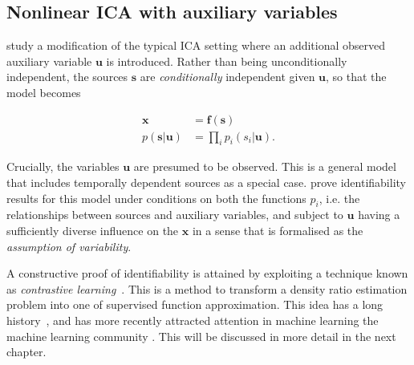 





\subsection{Nonlinear ICA with auxiliary variables}

\cite{hyvarinen19a} study a modification of the typical ICA setting where an additional observed auxiliary variable $\bm{u}$ is introduced.
Rather than being unconditionally independent, the sources $\bm{s}$ are \emph{conditionally} independent given $\bm{u}$, so that the model becomes

\begin{align}
\bm{x} &= \bm{f}(\bm{s}) \\
p(\bm{s}|\bm{u}) &= \prod_{i} p_i(s_i | \bm{u}).
\end{align}

Crucially, the variables $\bm{u}$ are presumed to be observed. 
This is a general model that includes temporally dependent sources as a special case.
\cite{hyvarinen19a} prove identifiability results for this model under conditions on both the functions $p_i$, i.e. the relationships between sources and auxiliary variables, and subject to $\bm{u}$ having a sufficiently diverse influence on the $\bm{x}$ in a sense that is formalised as the \emph{assumption of variability}.


A constructive proof of identifiability is attained by exploiting a technique known as \emph{contrastive learning}~\cite{gutmann2010noise}.
This is a method to transform a density ratio estimation problem into one of supervised function approximation. This idea has a long history~\cite{friedman2001elements}, and has more recently attracted attention in machine learning the machine learning community \cite{goodfellow2014generative, gutmann2010noise}. This will be discussed in more detail in the next chapter. 

